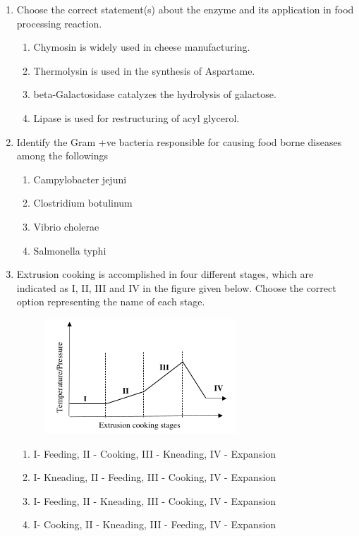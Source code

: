 \documentclass[journal,12pt,onecolumn]{IEEEtran}
\begin{document}
\begin{enumerate}
    \item Choose the correct statement(s) about the enzyme and its application in food processing reaction.
    \begin{enumerate}
        \item Chymosin is widely used in cheese manufacturing.
        \item Thermolysin is used in the synthesis of Aspartame.
        \item beta-Galactosidase catalyzes the hydrolysis of galactose.
        \item Lipase is used for restructuring of acyl glycerol.
    \end{enumerate}

    \item Identify the Gram +ve bacteria responsible for causing food borne diseases among the followings
    \begin{enumerate}
        \item Campylobacter jejuni
        \item Clostridium botulinum
        \item Vibrio cholerae
        \item Salmonella typhi
    \end{enumerate}

    \item Extrusion cooking is accomplished in four different stages, which are indicated as I, II, III and IV in the figure given below. Choose the correct option representing the name of each stage.\\
    \begin{figure}[H]
		\centering
            \includegraphics{115}
		    \caption*{}
		\label{fig:Q115}
	\end{figure}
    \begin{enumerate}
        \item I- Feeding, II - Cooking, III - Kneading, IV - Expansion
        \item I- Kneading, II - Feeding, III - Cooking, IV - Expansion
        \item I- Feeding, II - Kneading, III - Cooking, IV - Expansion
        \item I- Cooking, II - Kneading, III - Feeding, IV - Expansion
    \end{enumerate}


\end{enumerate}
\end{document}

